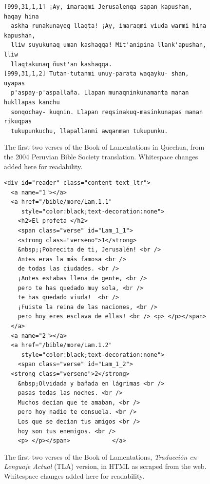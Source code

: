 \begin{figure}
\raggedright \begin{verbatim}
[999,31,1,1] ¡Ay, imaraqmi Jerusalenqa sapan kapushan, haqay hina
  askha runakunayoq llaqta! ¡Ay, imaraqmi viuda warmi hina kapushan,
  lliw suyukunaq uman kashaqqa! Mit'anipina llank'apushan, lliw
  llaqtakunaq ñust'an kashaqqa.
[999,31,1,2] Tutan-tutanmi unuy-parata waqayku- shan, uyapas
  p'aspay-p'aspallaña. Llapan munaqninkunamanta manan hukllapas kanchu
  sonqochay- kuqnin. Llapan reqsinakuq-masinkunapas manan rikuqpas
  tukupunkuchu, llapallanmi awqanman tukupunku.
\end{verbatim}
  \caption{The first two verses of the Book of Lamentations in Quechua, from
  the 2004 Peruvian Bible Society translation. Whitespace changes added here
  for readability.}
  \label{fig:loza}
\end{figure}

\begin{figure}
\raggedright \begin{verbatim}
<div id="reader" class="content text_ltr">
  <a name="1"></a>
  <a href="/bible/more/Lam.1.1"
     style="color:black;text-decoration:none">
    <h2>El profeta </h2>
    <span class="verse" id="Lam_1_1">
    <strong class="verseno">1</strong>
    &nbsp;¡Pobrecita de ti, Jerusalén! <br />
    Antes eras la más famosa <br />
    de todas las ciudades. <br />
    ¡Antes estabas llena de gente, <br />
    pero te has quedado muy sola, <br />
    te has quedado viuda!  <br />
    ¡Fuiste la reina de las naciones, <br />
    pero hoy eres esclava de ellas! <br /> <p> </p></span>
  </a>
  <a name="2"></a>
  <a href="/bible/more/Lam.1.2"
     style="color:black;text-decoration:none">
    <span class="verse" id="Lam_1_2">
  <strong class="verseno">2</strong>
    &nbsp;Olvidada y bañada en lágrimas <br />
    pasas todas las noches. <br />
    Muchos decían que te amaban, <br />
    pero hoy nadie te consuela. <br />
    Los que se decían tus amigos <br />
    hoy son tus enemigos. <br />
    <p> </p></span>            </a>
\end{verbatim}
  \caption{The first two verses of the Book of Lamentations, \emph{Traducción en
  Lenguaje Actual} (TLA) version, in HTML as scraped from the web. Whitespace
  changes added here for readability.}
  \label{fig:es-html-sample}
\end{figure}

